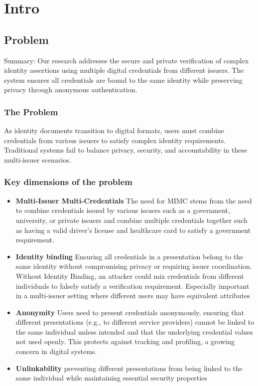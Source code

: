 \section{Intro}
\subsection{Problem}
Summary:
Our research addresses the secure and private verification of complex identity assertions using multiple digital credentials from different issuers. The system ensures all credentials are bound to the same identity while preserving privacy through anonymous authentication. 

\subsubsection{The Problem}

As identity documents transition to digital formats, users must combine credentials from various issuers to satisfy complex identity requirements. 
Traditional systems fail to balance privacy, security, and accountability in these multi-issuer scenarios.

\subsubsection{Key dimensions of the problem}
\begin{itemize}
    \item \textbf{Multi-Issuer Multi-Credentials} The need for MIMC stems from the need to combine credentials issued by various issuers such as a government, university, or private issuers and combine multiple credentials together such as having a valid driver's license and healthcare card to satisfy a government requirement. 

    \item \textbf{Identity binding} Ensuring all credentials in a presentation belong to the same identity without compromising privacy or requiring issuer coordination. Without Identity Binding, an attacker could mix credentials from different individuals to falsely satisfy a verification requirement. Especially important in a multi-issuer setting where different users may have equivalent attributes 

    \item \textbf{Anonymity} Users need to present credentials anonymously, ensuring that different presentations (e.g., to different service providers) cannot be linked to the same individual unless intended and that the underlying credential values not used openly. This protects against tracking and profiling, a growing concern in digital systems.

    \item \textbf{Unlinkability} preventing different presentations from being linked to the same individual while maintaining essential security properties


\end{itemize}


